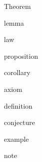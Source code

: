 
\begin{thm}\label{mod1:thm:name}
Theorem 
\end{thm}	

\begin{lem}\label{mod1:lem:name}
lemma
\end{lem}	

\begin{law}\label{mod1:law:name}
law
\end{law}

\begin{prop}\label{mod1:prop:name}
proposition
\end{prop}

\begin{cor}\label{mod1:cor:name}
corollary
\end{cor}

\begin{axiom}\label{mod1:axiom:name}
axiom
\end{axiom}

\begin{defn}\label{mod1:defn:name}
definition
\end{defn}

\begin{conj}\label{mod1:conj:name}
conjecture
\end{conj}

\begin{exmp}\label{mod1:exmp:name}
example
\end{exmp}

\begin{note}\label{mod1:note:name}
note
\end{note}

